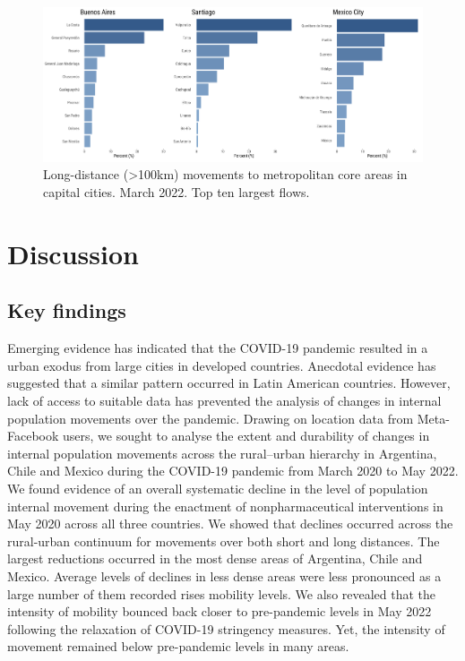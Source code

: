 \documentclass[
  11pt,
]{article}
\begin{document}
\begin{figure}

{\centering \includegraphics{../outputs/cloropleth-maps/composite_inflows-barp_long2022.png}

}

\caption{\label{fig-fig7}Long-distance (\textgreater100km) movements to
metropolitan core areas in capital cities. March 2022. Top ten largest
flows.}

\end{figure}

\hypertarget{sec-discussion}{%
\section{Discussion}\label{sec-discussion}}

\hypertarget{key-findings}{%
\subsection{Key findings}\label{key-findings}}

Emerging evidence has indicated that the COVID-19 pandemic resulted in a
urban exodus from large cities in developed countries. Anecdotal
evidence has suggested that a similar pattern occurred in Latin American
countries. However, lack of access to suitable data has prevented the
analysis of changes in internal population movements over the pandemic.
Drawing on location data from Meta-Facebook users, we sought to analyse
the extent and durability of changes in internal population movements
across the rural--urban hierarchy in Argentina, Chile and Mexico during
the COVID-19 pandemic from March 2020 to May 2022. We found evidence of
an overall systematic decline in the level of population internal
movement during the enactment of nonpharmaceutical interventions in May
2020 across all three countries. We showed that declines occurred across
the rural-urban continuum for movements over both short and long
distances. The largest reductions occurred in the most dense areas of
Argentina, Chile and Mexico. Average levels of declines in less dense
areas were less pronounced as a large number of them recorded rises
mobility levels. We also revealed that the intensity of mobility bounced
back closer to pre-pandemic levels in May 2022 following the relaxation
of COVID-19 stringency measures. Yet, the intensity of movement remained
below pre-pandemic levels in many areas.
\end{document}
